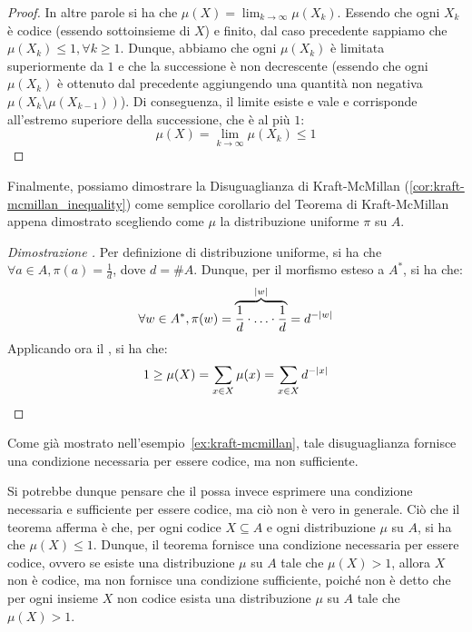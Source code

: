 \begin{proof}
  In altre parole si ha che \(\mu(X) = \lim_{k \to \infty} \mu(X_k)\). Essendo che ogni \(X_k\) è codice (essendo sottoinsieme di \(X\)) e finito, dal caso precedente sappiamo che \(\mu(X_k) \leq 1, \forall k \geq 1\).
  Dunque, abbiamo che ogni \(\mu(X_k)\) è limitata superiormente da \(1\) e che la successione è non decrescente (essendo che ogni \(\mu(X_k)\) è ottenuto dal precedente aggiungendo una quantità non negativa \(\mu(X_{k}\setminus\mu(X_{k-1}))\)). 
  Di conseguenza, il limite esiste e vale e corrisponde all'estremo superiore della successione, che è al più \(1\):
  \[\mu(X) = \lim_{k \to \infty} \mu(X_k) \leq 1\]
\end{proof}

Finalmente, possiamo dimostrare la Disuguaglianza di Kraft-McMillan (\ref{cor:kraft-mcmillan_inequality}) come semplice corollario del Teorema di Kraft-McMillan appena dimostrato scegliendo come \(\mu\) la distribuzione uniforme \(\pi\) su \(A\).

\begin{proof}[Dimostrazione ]
  Per definizione di distribuzione uniforme, si ha che \(\forall a \in A, \pi(a) = \frac{1}{d}\), dove \(d = \# A\).
  Dunque, per il morfismo esteso a \(A^*\), si ha che:
  \begin{equation*}
    \forall w \in A^*, \pi(w) = \overbrace{\frac{1}{d}\cdot\ldots\cdot\frac{1}{d}}^{\left|w\right|} = d^{-\lvert w\rvert}
  \end{equation*}
  Applicando ora il , si ha che:
  \[1 \geq\mu(X) = \sum_{x \in X} \mu(x) = \sum_{x \in X} d^{-\left|x\right|}\]
\end{proof}

Come già mostrato nell'esempio~\ref{ex:kraft-mcmillan}, tale disuguaglianza fornisce una condizione necessaria per essere codice, ma non sufficiente.

Si potrebbe dunque pensare che il  possa invece esprimere una condizione necessaria e sufficiente per essere codice, ma ciò non è vero in generale.
Ciò che il teorema afferma è che, per ogni codice \(X \subseteq A\) e ogni distribuzione \(\mu\) su \(A\), si ha che \(\mu(X) \leq 1\).
Dunque, il teorema fornisce una condizione necessaria per essere codice, ovvero se esiste una distribuzione \(\mu\) su \(A\) tale che \(\mu(X) > 1\), allora \(X\) non è codice, ma non fornisce una condizione sufficiente, poiché non è detto che per ogni insieme \(X\) non codice esista una distribuzione \(\mu\) su \(A\) tale che \(\mu(X) > 1\).

